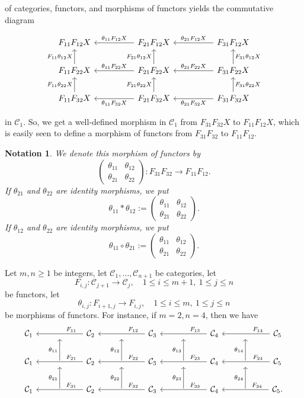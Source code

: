 \documentclass[12pt]{article}%
\newtheorem{nota}[thm]{Notation}
\theoremstyle{remark}
\theoremstyle{definition}
\newcommand{\nn}{\noindent}
\newcommand{\C}{\mathcal C}
\begin{document}
\nn of categories, functors, and morphisms of functors yields the commutative diagram 

$$
\begin{tikzcd}
%
F_{11}F_{12}X&&F_{21}F_{12}X\ar{ll}[swap]{\theta_{11}F_{12}X}&&F_{31}F_{12}X\ar{ll}[swap]{\theta_{21}F_{12}X}\\ 
%
F_{11}F_{22}X\ar{u}{F_{11}\theta_{12}X}&&F_{21}F_{22}X\ar{ll}[swap]{\theta_{11}F_{22}X}\ar{u}{F_{21}\theta_{12}X}&&F_{31}F_{22}X\ar{ll}[swap]{\theta_{21}F_{22}X}\ar{u}[swap]{F_{31}\theta_{12}X}\\ 
%
F_{11}F_{32}X\ar{u}{F_{11}\theta_{22}X}&&F_{21}F_{32}X\ar{ll}{\theta_{11}F_{32}X}\ar{u}{F_{21}\theta_{22}X}&&F_{31}F_{32}X\ar{ll}{\theta_{21}F_{32}X}\ar{u}[swap]{F_{31}\theta_{22}X}
%
\end{tikzcd}
$$ 

\nn in $\C_1$. So, we get a well-defined morphism in $\C_1$ from $F_{31}F_{32}X$ to $F_{11}F_{12}X$, which is easily seen to define a morphism of functors from $F_{31}F_{32}$ to $F_{11}F_{12}$. 

\begin{nota}\label{nhove}
We denote this morphism of functors by
$$
\begin{pmatrix}
\theta_{11}&\theta_{12}\\ 
\theta_{21}&\theta_{22}
\end{pmatrix}:F_{31}F_{32}\to F_{11}F_{12}.
$$ 
If $\theta_{21}$ and $\theta_{22}$ are identity morphisms, we put 
$$
\theta_{11}*\theta_{12}:=
\begin{pmatrix}
\theta_{11}&\theta_{12}\\ 
\theta_{21}&\theta_{22}
\end{pmatrix}.
$$ 
If $\theta_{12}$ and $\theta_{22}$ are identity morphisms, we put 
$$
\theta_{11}\circ\theta_{21}:=
\begin{pmatrix}
\theta_{11}&\theta_{12}\\ 
\theta_{21}&\theta_{22}
\end{pmatrix}.
$$ 
\end{nota}

Let $m,n\ge1$ be integers, let $\C_1,\dots,\C_{n+1}$ be categories, let 
$$
F_{i,j}:\C_{j+1}\to\C_j,\quad1\le i\le m+1,\ 1\le j\le n
$$
be functors, let 
$$
\theta_{i,j}:F_{i+1,j}\to F_{i,j},\quad1\le i\le m,\ 1\le j\le n
$$
be morphisms of functors. For instance, if $m=2,n=4$, then we have 
$$
\begin{tikzcd}
%
\C_1&{}&\C_2\ar{ll}{}[near start,swap]{F_{11}}&{}&\C_3\ar{ll}{}[near start,swap]{F_{12}}&{}&\C_4\ar{ll}{}[near start,swap]{F_{13}}&{}&\C_5\ar{ll}{}[near start,swap]{F_{14}}\\ 
%
\C_1&\ar{u}{\theta_{11}}&\C_2\ar{ll}{}[near start,swap]{F_{21}}&\ar{u}{\theta_{12}}&\C_3\ar{ll}{}[near start,swap]{F_{22}}&\ar{u}{\theta_{13}}&\C_4\ar{ll}{}[near start,swap]{F_{23}}&\ar{u}{\theta_{14}}&\C_5\ar{ll}{}[near start,swap]{F_{24}}\\ 
%
\C_1&\ar{u}{\theta_{21}}&\C_2\ar{ll}{}[near start,swap]{F_{31}}&\ar{u}{\theta_{22}}&\C_3\ar{ll}{}[near start,swap]{F_{32}}&\ar{u}{\theta_{23}}&\C_4\ar{ll}{}[near start,swap]{F_{33}}&\ar{u}{\theta_{24}}&\C_5\ar{ll}{}[near start,swap]{F_{34}}.
\end{tikzcd}
$$ 
\end{document}
